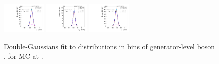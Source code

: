 \begin{figure}[htb]
\includegraphics[width=0.19\textwidth]{plots/Appendix_Recoil_Fits/WmmMC_PF_5TeV_2G/pfu1fit_32.pdf}
\includegraphics[width=0.19\textwidth]{plots/Appendix_Recoil_Fits/WmmMC_PF_5TeV_2G/pfu1fit_33.pdf}
\includegraphics[width=0.19\textwidth]{plots/Appendix_Recoil_Fits/WmmMC_PF_5TeV_2G/pfu1fit_34.pdf}
\caption{Double-Gaussians fit to \upar distributions in bins of generator-level boson \pt, for \Wm MC at \serag.}
\label{fig:a:recoil:fit:mc:u1:5}
\end{figure}